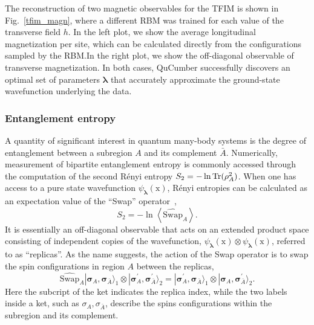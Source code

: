 \documentclass[submission, Phys, hidelnks]{SciPost}
\newcommand{\x}{\bm{\mathrm{x}}}
\begin{document}
The reconstruction of two magnetic observables for the TFIM is shown in
Fig.~\ref{tfim_magn}, where a different RBM was trained for each value of
the transverse field $h$. In the left plot, we show the average longitudinal
magnetization per site, which can be calculated directly from the
configurations sampled by the RBM.\@ In the right plot, we show the off-diagonal
observable of transverse magnetization. In both cases, QuCumber successfully
discovers an optimal set of parameters $\bm{\lambda}$ that accurately
approximate the ground-state wavefunction underlying the data.


\subsubsection{Entanglement entropy}\label{sec:swap}

A quantity of significant interest in quantum many-body systems is the degree of
entanglement between a subregion $A$ and its complement $\bar{A}$.
Numerically, measurement of bipartite entanglement entropy is commonly accessed
through the computation of the second R\'enyi entropy $S_2 = - \ln {\rm Tr}(\rho_A^2)$.
When one has access to a pure state wavefunction $\psi_{\bm{\lambda}}(\x)$,
R\'enyi entropies can be calculated as an expectation value of the ``Swap'' operator~\cite{Swap},
\begin{equation}
S_2 = - \ln \left\langle{   \widehat{\textrm{Swap}}_A  }\right\rangle.
\end{equation}
It is essentially an off-diagonal observable that acts on an extended product space consisting of
independent copies of the wavefunction,
$\psi_{\bm{\lambda}}(\x) \otimes \psi_{\bm{\lambda}}(\x)$, referred to as
``replicas''.
As the name suggests, the action of the Swap operator is to swap the spin
configurations in region $A$ between the replicas,
\begin{equation}
  \widehat{\textrm{Swap}}_A |\bm{\sigma}_A, \bm{\sigma}_{\bar A}\rangle_1 \otimes  |\bm{\sigma}^{\prime}_A, \bm{\sigma}^{\prime}_{\bar A}\rangle_2 = |\bm{\sigma}^{\prime}_A, \bm\sigma_{\bar A}\rangle_1 \otimes  |\bm\sigma_A, \bm\sigma^{\prime}_{\bar A}\rangle_2 .
\end{equation}
Here the subcript of the ket indicates the replica index, while the two labels
inside a ket, such as $\sigma_A, \sigma_{\bar A}$, describe the spins
configurations within the subregion and its complement.
\end{document}
